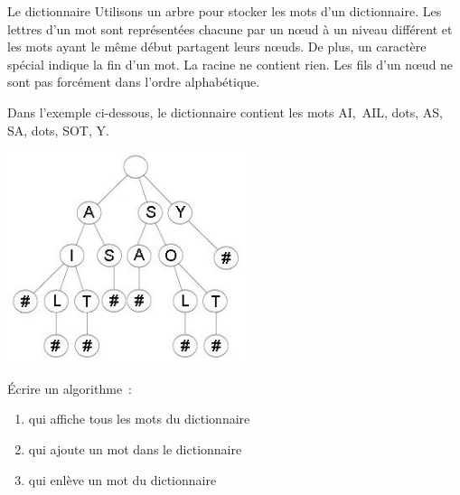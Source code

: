 			\begin{Exercice}{Le dictionnaire}
				Utilisons un arbre pour stocker les mots d'un dictionnaire. 
				Les lettres d'un mot sont représentées chacune par
				un n{\oe}ud à un niveau différent et les mots ayant 
				le même début partagent leurs n{\oe}uds. De plus, un caractère
				spécial indique la fin d'un mot. La racine ne contient 
				rien. Les fils d'un n{\oe}ud ne sont pas forcément dans 
				l'ordre	alphabétique.
				
				Dans l'exemple ci-dessous, le dictionnaire contient les mots 
				AI,~AIL, {dots}, AS, SA, {dots}, SOT, Y.
				\begin{center}
				\includegraphics[width=6.999cm,height=6.195cm]{image/a2012Logique2eme-img039.jpg}
				\end{center}
				
				Écrire un algorithme~:
				
				\begin{enumerate}
					\item {
						qui affiche tous les mots du dictionnaire}
					\item {
						qui ajoute un mot dans le dictionnaire}
					\item {
						qui enlève un mot du dictionnaire}
				\end{enumerate}
			\end{Exercice}
			
